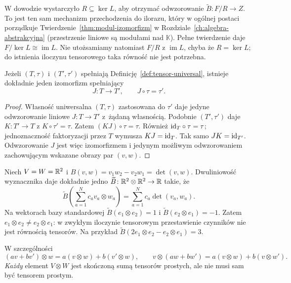 \begin{uwaga}
\label{rem:tensor-iloraz-izomorfizm}
W dowodzie wystarczyło $R\subseteq\ker L$, aby otrzymać
odwzorowanie $\widetilde B:F/R\to Z$. To jest ten sam mechanizm
przechodzenia do ilorazu, który w ogólnej postaci
porządkuje Twierdzenie~\ref{thm:modul-izomorfizm}
w Rozdziale~\ref{ch:algebra-abstrakcyjna}
(przestrzenie liniowe są modułami nad $\mathbb K$).
Pełne twierdzenie daje $F/\ker L\cong\operatorname{im}L$.
Nie utożsamiamy natomiast $F/R$ z $\operatorname{im}L$,
chyba że $R=\ker L$; do istnienia iloczynu tensorowego
taka równość nie jest potrzebna.
\end{uwaga}

\begin{twierdzenie}[Jednoznaczność]
\label{thm:tensor-jednoznacznosc}
Jeżeli $(T,\tau)$ i $(T',\tau')$ spełniają
Definicję~\ref{def:tensor-universal}, istnieje dokładnie jeden
izomorfizm spełniający
\[
 J\colon T\to T',\qquad J\circ\tau=\tau'.
\]
\end{twierdzenie}
\begin{proof}
Własność uniwersalna $(T,\tau)$ zastosowana do $\tau'$ daje
jedyne odwzorowanie liniowe $J\colon T\to T'$ z~żądaną własnością.
Podobnie $(T',\tau')$ daje $K\colon T'\to T$ z
$K\circ\tau'=\tau$. Zatem $(KJ)\circ\tau=\tau$.
Również $\mathrm{id}_T\circ\tau=\tau$; jednoznaczność faktoryzacji
przez $T$ wymusza $KJ=\mathrm{id}_T$. Tak samo $JK=\mathrm{id}_{T'}$.
Odwzorowanie $J$ jest więc izomorfizmem i jedynym możliwym odwzorowaniem
zachowującym wskazane obrazy par $(v,w)$.
\end{proof}

\begin{przyklad}
Niech $V=W=\mathbb{R}^2$ i
$B(v,w)=v_1w_2-v_2w_1=\det(v,w)$.
Dwuliniowość wyznacznika daje dokładnie jedno
$\widetilde B\colon\mathbb{R}^2\otimes\mathbb{R}^2\to\mathbb{R}$ takie, że
\[
 \widetilde B\!\left(\sum_{a=1}^N c_a v_a\otimes w_a\right)
 =\sum_{a=1}^N c_a\det(v_a,w_a).
\]
Na wektorach bazy standardowej
$\widetilde B(e_1\otimes e_2)=1$ i
$\widetilde B(e_2\otimes e_1)=-1$.
Zatem $e_1\otimes e_2\ne e_2\otimes e_1$:
w zwykłym iloczynie tensorowym przestawienie czynników
nie jest równością tensorów. Na przykład
$\widetilde B(2e_1\otimes e_2-e_2\otimes e_1)=3$.
\end{przyklad}

W szczególności
\begin{equation}\label{eq:tensor-biliniowosc}
 (av+bv')\otimes w=a(v\otimes w)+b(v'\otimes w),\qquad
 v\otimes(aw+bw')=a(v\otimes w)+b(v\otimes w').
\end{equation}
\emph{Każdy} element $V\otimes W$ jest skończoną sumą tensorów
prostych, ale nie musi sam być tensorem prostym.

